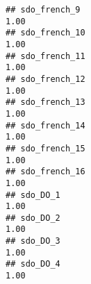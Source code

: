 \documentclass[
]{article}
\begin{document}
\begin{verbatim}
## sdo_french_9                                                                                                                                                                                                                1.00
## sdo_french_10                                                                                                                                                                                                               1.00
## sdo_french_11                                                                                                                                                                                                               1.00
## sdo_french_12                                                                                                                                                                                                               1.00
## sdo_french_13                                                                                                                                                                                                               1.00
## sdo_french_14                                                                                                                                                                                                               1.00
## sdo_french_15                                                                                                                                                                                                               1.00
## sdo_french_16                                                                                                                                                                                                               1.00
## sdo_DO_1                                                                                                                                                                                                                    1.00
## sdo_DO_2                                                                                                                                                                                                                    1.00
## sdo_DO_3                                                                                                                                                                                                                    1.00
## sdo_DO_4                                                                                                                                                                                                                    1.00

\end{verbatim}
\end{document}
